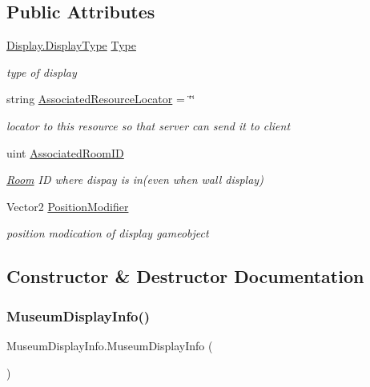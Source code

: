 \subsection*{Public Attributes}
\begin{DoxyCompactItemize}
\item 
\mbox{\hyperlink{class_display_a7f7abc559192ef7e8f4a03382d3492d7}{Display.\+Display\+Type}} \mbox{\hyperlink{class_museum_display_info_a547f4b6e15ae0f48408bf999019955e2}{Type}}
\begin{DoxyCompactList}\small\item\em type of display \end{DoxyCompactList}\item 
string \mbox{\hyperlink{class_museum_display_info_a970766829776ea0063ad414c4790714a}{Associated\+Resource\+Locator}} = \char`\"{}\char`\"{}
\begin{DoxyCompactList}\small\item\em locator to this resource so that server can send it to client \end{DoxyCompactList}\item 
uint \mbox{\hyperlink{class_museum_display_info_af044b6e18f3d6f17832ee2bd10c0cc62}{Associated\+Room\+ID}}
\begin{DoxyCompactList}\small\item\em \mbox{\hyperlink{class_room}{Room}} ID where dispay is in(even when wall display) \end{DoxyCompactList}\item 
Vector2 \mbox{\hyperlink{class_museum_display_info_ab51b43a4fad77be4256ee61a957bfbfb}{Position\+Modifier}}
\begin{DoxyCompactList}\small\item\em position modication of display gameobject \end{DoxyCompactList}\end{DoxyCompactItemize}


\subsection{Constructor \& Destructor Documentation}
\mbox{\label{class_museum_display_info_a755099749d31cd5c6f06a2d0210832b9}} 
\subsubsection{\texorpdfstring{Museum\+Display\+Info()}{MuseumDisplayInfo()}}
{\footnotesize\ttfamily Museum\+Display\+Info.\+Museum\+Display\+Info (\begin{DoxyParamCaption}{ }\end{DoxyParamCaption})}



